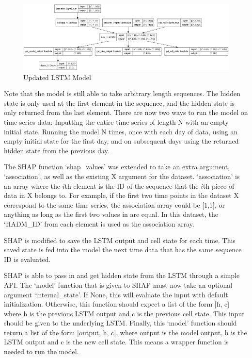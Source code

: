 \documentclass[12pt]{article}
\begin{document}
\begin{figure}[H]
\centering\caption{Updated LSTM Model}
\includegraphics[scale=0.26]{BIG model.png}
\end{figure}

Note that the model is still able to take arbitrary length sequences. The hidden state is only used at the first element in the sequence, and the hidden state is only returned from the last element. There are now two ways to run the model on time series data: Inputting the entire time series of length N with an empty initial state. Running the model N times, once with each day of data, using an empty initial state for the first day, and on subsequent days using the returned hidden state from the previous day.

The SHAP function `shap\_values' was extended to take an extra argument, `association', as well as the existing X argument for the dataset. `association' is an array where the $i$th element is the ID of the sequence that the $i$th piece of data in X belongs to. For example, if the first two time points in the dataset X correspond to the same time series, the association array could be [1,1], or anything as long as the first two values in are equal. In this dataset, the `HADM\_ID' from each element is used as the association array.

SHAP is modified to save the LSTM output and cell state for each time. This saved state is fed into the model the next time data that has the same sequence ID is evaluated. 

SHAP is able to pass in and get hidden state from the LSTM through a simple API. The `model' function that is given to SHAP must now take an optional argument `internal\_state'. If None, this will evaluate the input with default initialization. Otherwise, this function should expect a list of the form [h, c] where h is the previous LSTM output and c is the previous cell state. This input should be given to the underlying LSTM. Finally, this `model' function should return a list of the form [output, h, c], where output is the model output, h is the LSTM output and c is the new cell state. This means a wrapper function is needed to run the model. 
\end{document}
